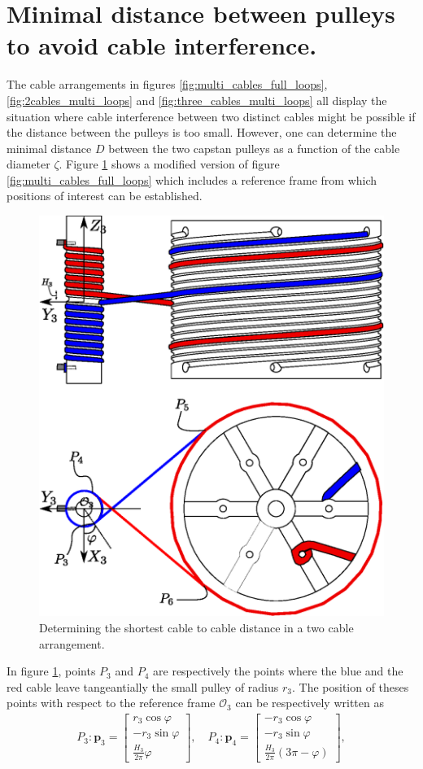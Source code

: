 \documentclass[10pt,cleanfoot]{asme2ej}
\begin{document}
\section{Minimal distance between pulleys to avoid cable interference.}
The cable arrangements in figures \ref{fig:multi_cables_full_loops}, \ref{fig:2cables_multi_loops} and \ref{fig:three_cables_multi_loops} all display the situation where cable interference between two distinct cables might be possible if the distance between the pulleys is too small. However, one can determine the minimal distance $D$ between the two capstan pulleys as a function of the cable diameter $\zeta$. Figure \ref{fig:cable_interference} shows a modified version of figure \ref{fig:multi_cables_full_loops} which includes a reference frame from which positions of interest can be established. 
\begin{figure}
\centering
\includegraphics[width =0.5\columnwidth]{fig_cable_interference.eps}
\caption{Determining the shortest cable to cable distance in a two cable arrangement.}
\label{fig:cable_interference}
\end{figure}
 In figure \ref{fig:cable_interference}, points $P_3$ and $P_4$ are respectively the points where the blue and the red cable leave tangeantially the small pulley of radius $r_3$.
The position of theses points with respect to the reference frame $\mathcal{O}_3$ can be respectively written as 
\begin{align}
P_3: \mathbf{p}_3 = \begin{bmatrix}
r_3\cos\varphi\\
-r_3\sin\varphi\\
\frac{H_3}{2\pi}\varphi
\end{bmatrix},\quad P_4:\mathbf{p}_4 = \begin{bmatrix}
-r_3\cos\varphi\\
-r_3\sin\varphi\\
\frac{H_3}{2\pi}\left(3\pi-\varphi\right)
\end{bmatrix},
\end{align}
\end{document}

